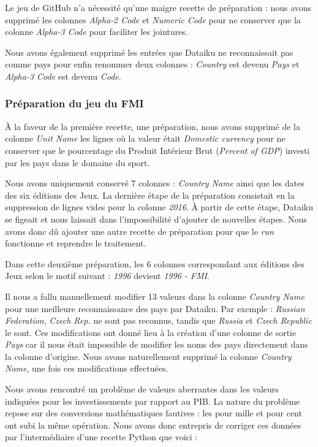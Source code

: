 \documentclass[hidelinks, 12pt]{article}
\begin{document}
Le jeu de GitHub n'a nécessité qu'une maigre recette de préparation : nous avons supprimé les colonnes \emph{Alpha-2 Code} et \emph{Numeric Code} pour ne conserver que la colonne \emph{Alpha-3 Code} pour faciliter les jointures.

Nous avons également supprimé les entrées que Dataiku ne reconnaissait pas comme pays pour enfin renommer deux colonnes : \emph{Country} est devenu \emph{Pays} et \emph{Alpha-3 Code} est devenu \emph{Code}.

\subsubsection{Préparation du jeu du FMI}

À la faveur de la première recette, une préparation, nous avons supprimé de la colonne \emph{Unit Name} les lignes où la valeur était \emph{Domestic currency} pour ne conserver que le pourcentage du Produit Intérieur Brut (\emph{Percent of GDP}) investi par les pays dans le domaine du sport.

Nous avons uniquement conservé 7 colonnes : \emph{Country Name} ainsi que les dates des six éditions des Jeux. La dernière étape de la préparation consistait en la suppression de lignes vides pour la colonne \emph{2016}. À partir de cette étape, Dataiku se figeait et nous laissait dans l'impossibilité d'ajouter de nouvelles étapes. Nous avons donc dû ajouter une autre recette de préparation pour que le \emph{run} fonctionne et reprendre le traitement.

Dans cette deuxième préparation, les 6 colonnes correspondant aux éditions des Jeux selon le motif suivant : \emph{1996} devient \emph{1996 - FMI}. 

Il nous a fallu manuellement modifier 13 valeurs dans la colonne \emph{Country Name} pour une meilleure reconnaissance des pays par Dataiku. Par exemple : \emph{Russian Federation}, \emph{Czech Rep.} ne sont pas reconnus, tandis que \emph{Russia} et \emph{Czech Republic} le sont. Ces modifications ont donné lieu à la création d'une colonne de sortie \emph{Pays} car il nous était impossible de modifier les noms des pays directement dans la colonne d'origine. Nous avons naturellement supprimé la colonne \emph{Country Name}, une fois ces modifications effectuées. 

Nous avons rencontré un problème de valeurs aberrantes dans les valeurs indiquées pour les investissements par rapport au PIB. La nature du problème repose sur des conversions mathématiques fautives : les pour mille et pour cent ont subi la même opération. Nous avons donc entrepris de corriger ces données par l'intermédiaire d'une recette Python que voici :
\end{document}
